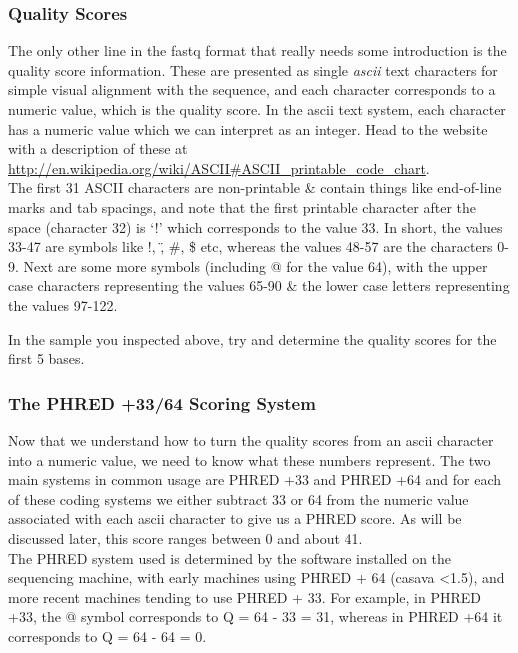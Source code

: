 \subsubsection{Quality Scores}
\begin{information}
The only other line in the fastq format that really needs some introduction is the quality score information.
These are presented as single \textit{ascii} text characters for simple visual alignment with the sequence, and each character corresponds to a numeric value, which is the quality score.
In the ascii text system, each character has a numeric value which we can interpret as an integer.
Head to the website with a description of these at \url{http://en.wikipedia.org/wiki/ASCII#ASCII\_printable\_code\_chart}.\\

The first 31 ASCII characters are non-printable \& contain things like end-of-line marks and tab spacings, and note that the first printable character after the space (character 32) is `!' which corresponds to the value 33.
In short, the values 33-47 are symbols like !, \", \#, \$ etc, whereas the values 48-57 are the characters 0-9.
Next are some more symbols (including @ for the value 64), with the upper case characters representing the values 65-90 \& the lower case letters representing the values 97-122.\\

\end{information}

\begin{questions}
In the sample you inspected above, try and determine the quality scores for the first 5 bases.\\
\end{questions}

\subsubsection{The PHRED +33/64 Scoring System}
\begin{information}
Now that we understand how to turn the quality scores from an ascii character into a numeric value, we need to know what these numbers represent.
The two main systems in common usage are PHRED +33 and PHRED +64 and for each of these coding systems we either subtract 33 or 64 from the numeric value associated with each ascii character to give us a PHRED score.
As will be discussed later, this score ranges between 0 and about 41.\\

The PHRED system used is determined by the software installed on the sequencing machine, with early machines using PHRED + 64 (casava \textless 1.5), and more recent machines tending to use PHRED + 33.
For example, in PHRED +33, the @ symbol corresponds to Q = 64 - 33 = 31, whereas in PHRED +64 it corresponds to Q = 64 - 64 = 0. \\
\end{information}


